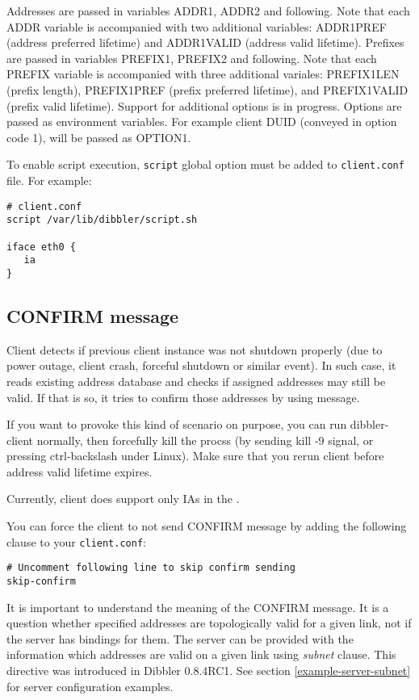 Addresses are passed in variables ADDR1, ADDR2 and following. Note
that each ADDR variable is accompanied with two additional variables:
ADDR1PREF (address preferred lifetime) and ADDR1VALID (address valid
lifetime). Prefixes are passed in variables PREFIX1, PREFIX2 and
following. Note that each PREFIX variable is accompanied with three
additional variales: PREFIX1LEN (prefix length), PREFIX1PREF (prefix
preferred lifetime), and PREFIX1VALID (prefix valid lifetime). Support
for additional options is in progress. Options are passed as
environment variables. For example client DUID (conveyed in option
code 1), will be passed as OPTION1.

To enable script execution, \verb+script+ global option must
be added to \verb+client.conf+ file. For example:

\begin{lstlisting}
# client.conf
script /var/lib/dibbler/script.sh

iface eth0 {
   ia
}
\end{lstlisting}

\subsection{CONFIRM message}
\label{feature-confirm}
Client detects if previous client instance was not shutdown properly
(due to power outage, client crash, forceful shutdown or similar
event). In such case, it reads existing address database and checks if
assigned addresses may still be valid. If that is so, it tries to
confirm those addresses by using  message.

If you want to provoke this kind of scenario on purpose, you can run
dibbler-client normally, then forcefully kill the procss (by sending
kill -9 signal, or pressing ctrl-backslash under Linux). Make sure
that you rerun client before address valid lifetime expires.

Currently, client does support only IAs in the .

You can force the client to not send CONFIRM message by adding the
following clause to your \verb+client.conf+:

\begin{lstlisting}
# Uncomment following line to skip confirm sending
skip-confirm
\end{lstlisting}

It is important to understand the meaning of the CONFIRM message. It
is a question whether specified addresses are topologically valid for
a given link, not if the server has bindings for them. The server can
be provided with the information which addresses are valid on a given
link using \emph{subnet} clause. This directive was introduced in
Dibbler 0.8.4RC1. See section \ref{example-server-subnet} for server
configuration examples.

